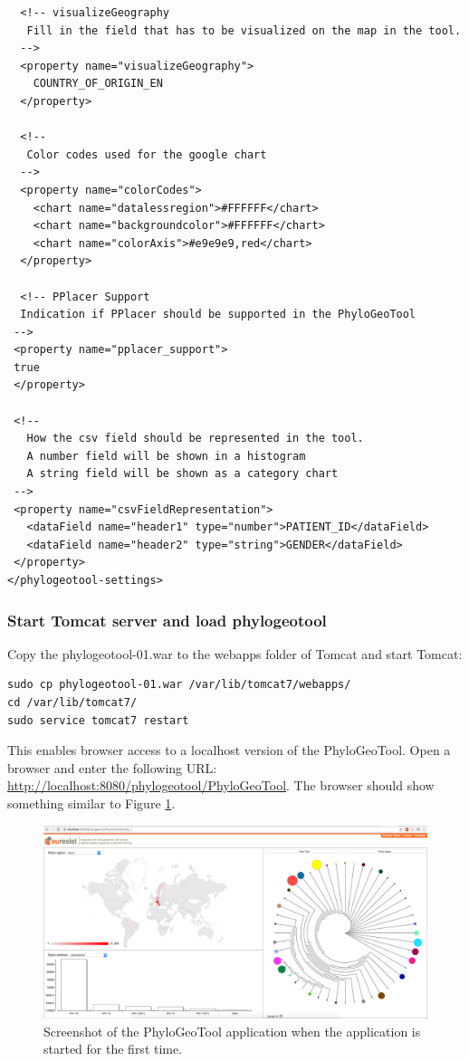 \documentclass[a4paper, 11pt]{article} %
\begin{document}
\begin{verbatim}
  <!-- visualizeGeography 
   Fill in the field that has to be visualized on the map in the tool.
  -->
  <property name="visualizeGeography">
  	COUNTRY_OF_ORIGIN_EN
  </property>

  <!-- 
   Color codes used for the google chart
  -->
  <property name="colorCodes">
    <chart name="datalessregion">#FFFFFF</chart>
    <chart name="backgroundcolor">#FFFFFF</chart>    
    <chart name="colorAxis">#e9e9e9,red</chart>
  </property>
  
  <!-- PPlacer Support
  Indication if PPlacer should be supported in the PhyloGeoTool
 -->
 <property name="pplacer_support">
 true
 </property>

 <!--
   How the csv field should be represented in the tool.
   A number field will be shown in a histogram
   A string field will be shown as a category chart
 -->
 <property name="csvFieldRepresentation">
   <dataField name="header1" type="number">PATIENT_ID</dataField>
   <dataField name="header2" type="string">GENDER</dataField>
 </property>
</phylogeotool-settings>
\end{verbatim}



\subsubsection{Start Tomcat server and load phylogeotool}

Copy the phylogeotool-01.war to the webapps folder of Tomcat and start Tomcat:
\begin{verbatim}
sudo cp phylogeotool-01.war /var/lib/tomcat7/webapps/
cd /var/lib/tomcat7/
sudo service tomcat7 restart
\end{verbatim}
This enables browser access to a localhost version of the PhyloGeoTool.
Open a browser and enter the following URL: \url{http://localhost:8080/phylogeotool/PhyloGeoTool}.
The browser should show something similar to Figure \ref{fig:01}.



\begin{figure}[!htbp]
\includegraphics[scale=0.19]{images/defaultScreenshot.png}
\caption{Screenshot of the PhyloGeoTool application when the application is started for the first time.}
\label{fig:01} 
\end{figure}
\end{document}
